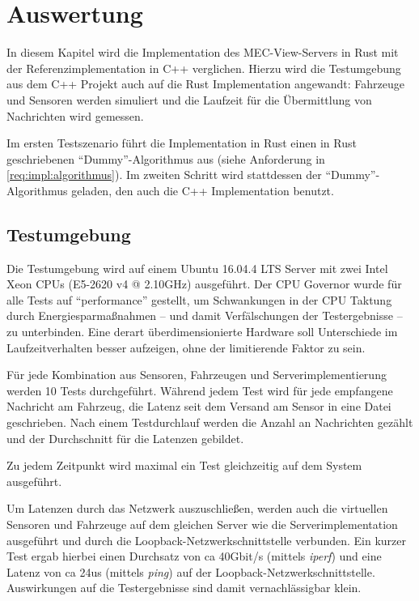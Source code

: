 
			
\chapter{Auswertung}

In diesem Kapitel wird die Implementation des MEC-View-Servers in Rust mit der Referenzimplementation in C++ verglichen.
Hierzu wird die Testumgebung aus dem C++ Projekt auch auf die Rust Implementation angewandt: Fahrzeuge und Sensoren werden simuliert und die Laufzeit für die Übermittlung von Nachrichten wird gemessen.

Im ersten Testszenario führt die Implementation in Rust einen in Rust geschriebenen \enquote{Dummy}-Algorithmus aus (siehe Anforderung  in \autoref{req:impl:algorithmus}).
Im zweiten Schritt wird stattdessen der \enquote{Dummy}-Algorithmus geladen, den auch die C++ Implementation benutzt.



\section{Testumgebung}

Die Testumgebung wird auf einem Ubuntu 16.04.4 LTS Server mit zwei Intel Xeon CPUs (E5-2620 v4 @ 2.10GHz) ausgeführt.
Der CPU Governor wurde für alle Tests auf \enquote{performance} gestellt, um Schwankungen in der CPU Taktung durch Energiesparmaßnahmen -- und damit Verfälschungen der Testergebnisse -- zu unterbinden.
Eine derart überdimensionierte Hardware soll Unterschiede im Laufzeitverhalten besser aufzeigen, ohne der limitierende Faktor zu sein.

Für jede Kombination aus Sensoren, Fahrzeugen und Serverimplementierung werden 10 Tests durchgeführt.
Während jedem Test wird für jede empfangene Nachricht am Fahrzeug, die Latenz seit dem Versand am Sensor in eine Datei geschrieben.
Nach einem Testdurchlauf werden die Anzahl an Nachrichten gezählt und der Durchschnitt für die Latenzen gebildet.

Zu jedem Zeitpunkt wird maximal ein Test gleichzeitig auf dem System ausgeführt.

Um Latenzen durch das Netzwerk auszuschließen, werden auch die virtuellen Sensoren und Fahrzeuge auf dem gleichen Server wie die Serverimplementation ausgeführt und durch die Loopback-Netzwerkschnittstelle verbunden.
Ein kurzer Test ergab hierbei einen Durchsatz von ca 40Gbit/s (mittels \textit{iperf}) und eine Latenz von ca 24us (mittels \textit{ping}) auf der Loopback-Netzwerkschnittstelle.
Auswirkungen auf die Testergebnisse sind damit vernachlässigbar klein.

